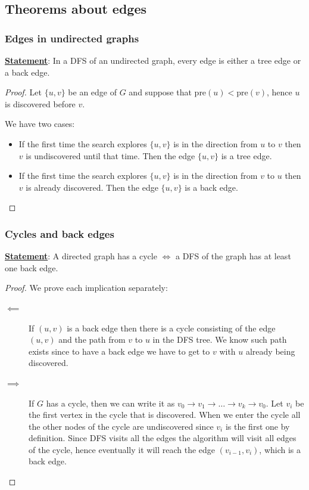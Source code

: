 \documentclass[12pt]{extarticle}
\begin{document}
\subsection{Theorems about edges}

\subsubsection{Edges in undirected graphs}

\textbf{\underline{Statement}}: In a DFS of an undirected graph, every edge is either a tree edge or a back edge.

\begin{proof}
    Let $\{u, v\}$ be an edge of $G$ and suppose that $\text{pre}(u) < \text{pre}(v)$, hence $u$ is discovered before $v$.

    We have two cases:

    \begin{itemize}
        \item If the first time the search explores $\{u, v\}$ is in the direction from $u$ to $v$ then $v$ is undiscovered until that time.
              Then the edge $\{u, v\}$ is a tree edge.
        \item If the first time the search explores $\{u, v\}$ is in the direction from $v$ to $u$ then $v$ is already discovered.
              Then the edge $\{u, v\}$ is a back edge.
    \end{itemize}
\end{proof}

\subsubsection{Cycles and back edges}

\textbf{\underline{Statement}}: A directed graph has a cycle $\iff$ a DFS of the graph has at least one back edge.

\begin{proof}
    We prove each implication separately:

    \begin{description}
        \item[$\impliedby$] If $(u, v)$ is a back edge then there is a cycle consisting of the edge $(u, v)$ and the path from $v$ to $u$ in the DFS tree. We know such path exists since to have a back edge we have to get to $v$ with $u$ already being discovered.
        \item[$\implies$] If $G$ has a cycle, then we can write it as $v_0 \to v_1 \to \dots \to v_k \to v_0$.
              Let $v_i$ be the first vertex in the cycle that is discovered.
              When we enter the cycle all the other nodes of the cycle are undiscovered since $v_i$ is the first one by definition. Since DFS visits all the  edges the algorithm will visit all edges of the cycle, hence eventually it will reach the edge $(v_{i-1}, v_i)$, which is a back edge.
    \end{description}
\end{proof}
\end{document}
